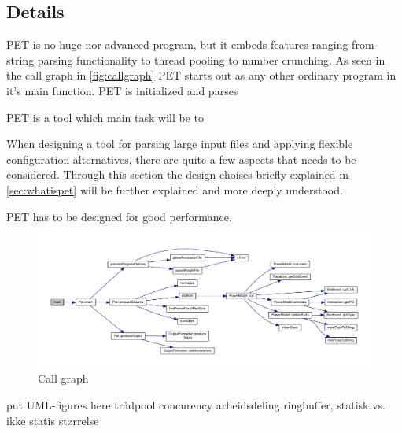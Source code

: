 \subsection{Details}

PET is no huge nor advanced program, but it embeds features ranging from string
parsing functionality to thread pooling to number crunching. As seen in the call graph
in \autoref{fig:callgraph} PET starts out as any other ordinary program in it's main
function. PET is initialized and parses 


PET is a tool which main task will be to 

When designing a tool for parsing large input files and applying flexible configuration alternatives,
there are quite a few aspects that needs to be considered. Through this section the design choises
briefly explained in \autoref{sec:whatispet} will be further explained and more deeply understood.

PET has to be designed for good performance.


\begin{figure}
%    
    \includegraphics[width=\textwidth]{figs/maincallgraph.pdf}
    \caption{Call graph}
    \label{fig:callgraph}
\end{figure}

put UML-figures here
trådpool
concurency
arbeidsdeling
ringbuffer, statisk vs. ikke statis størrelse




